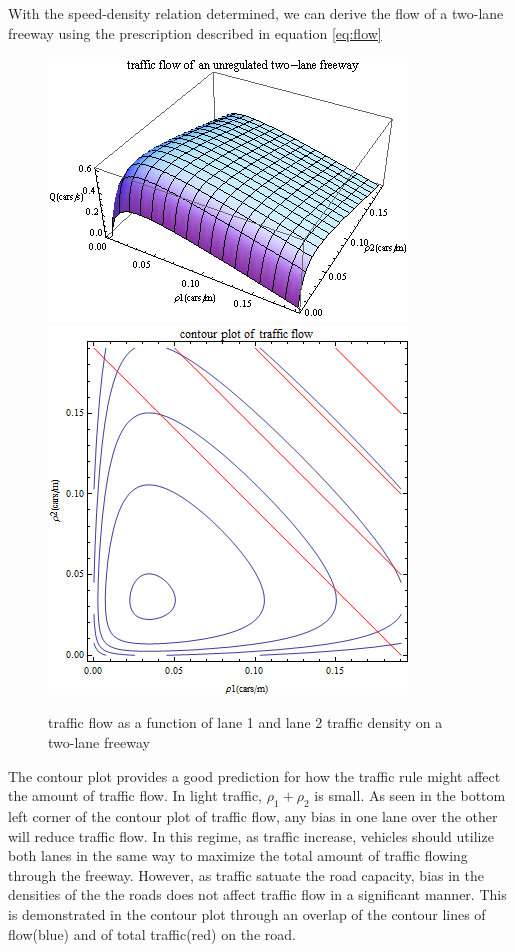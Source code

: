	With the speed-density relation determined, we can derive the flow of a two-lane freeway using the prescription described in equation \ref{eq:flow}
	\begin{figure}[h]
	\includegraphics[scale=.6]{plot/unregulated_flow}
	\includegraphics[scale=.45]{plot/contour_flow}
	\caption{traffic flow as a function of lane 1 and lane 2 traffic density on a two-lane freeway}
	\end{figure}
	
	The contour plot provides a good prediction for how the traffic rule might affect the amount of traffic flow. In light traffic, $\rho_1+\rho_2$ is small. As seen in the bottom left corner of the contour plot of traffic flow, any bias in one lane over the other will reduce traffic flow. In this regime, as traffic increase, vehicles should utilize both lanes in the same way to maximize the total amount of traffic flowing through the freeway. However, as traffic satuate the road capacity, bias in the densities of the the roads does not affect traffic flow in a significant manner. This is demonstrated in the contour plot through an overlap of the contour lines of flow(blue) and of total traffic(red) on the road.
	